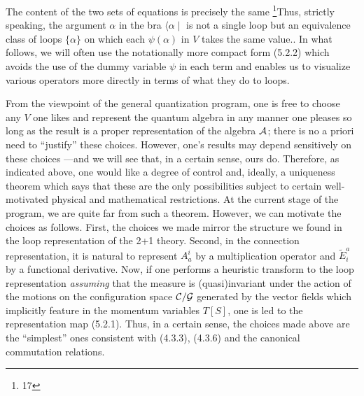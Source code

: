 The content of the two sets of equations is precisely the same%
\footnote{17}{Thus, strictly speaking, the argument $\alpha$ in the bra
$\langle \alpha\mid$ is not a single loop but an equivalence class of loops
$\{\alpha\}$ on which each $\psi(\alpha )$ in $V$ takes the same value.}.
In what follows, we will often use the notationally more compact form (5.2.2)
which avoids the use of the dummy variable $\psi$ in each term and enables
us to visualize various operators more directly in terms of what they do to
loops.

{}From the viewpoint of the general quantization program, one is free to
choose any $V$ one likes and represent the quantum algebra in any manner
one pleases so long as the result is a proper representation of the algebra
${\cal A}$; there is no a priori need to ``justify'' these choices. However,
one's results may depend sensitively on these choices ---and we will see
that, in a certain sense, ours do. Therefore, as indicated above, one would
like a degree of control and, ideally, a uniqueness theorem which says that
these are the only possibilities subject to certain well-motivated physical
and mathematical restrictions. At the current stage of the program, we are
quite far from such a theorem. However, we can motivate the choices
as follows. First, the choices we made mirror the structure we found in
the loop representation of the 2+1 theory. Second, in the connection
representation, it is natural to represent $A_a^i$ by a multiplication
operator and $\tilde{E}^a_i$ by a functional derivative. Now, if one performs
a heuristic transform to the loop representation {\it assuming} that the
measure is (quasi)\-invariant under the action of the motions on the
configuration space ${\cal C}/{\cal G}$ generated by the vector fields which
implicitly feature in the momentum variables $T[S]$, one is led to the
representation map (5.2.1). Thus, in a certain sense, the choices made above
are the ``simplest'' ones consistent with (4.3.3), (4.3.6) and the canonical
commutation relations.

